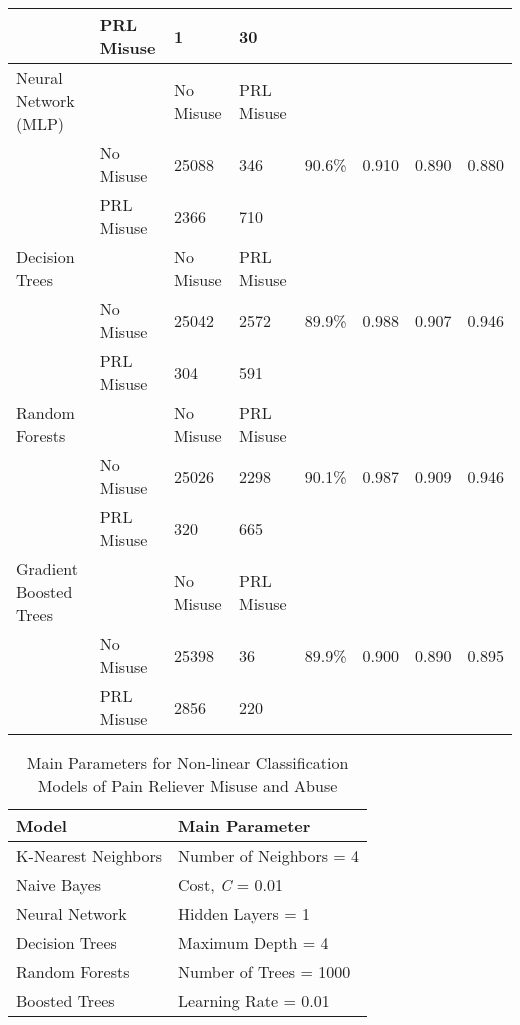 \documentclass[sigconf]{acmart}
\begin{document}
\begin{table*}[ht]
\begin{tabular}{llllllll}
     & PRL Misuse & 1 & 30 &  &  &  & \\
    \midrule
    Neural Network (MLP) & & No Misuse & PRL Misuse &  &  &  & \\
     & No Misuse & 25088 & 346 & 90.6\% & 0.910 & 0.890 & 0.880 \\
     & PRL Misuse & 2366 & 710 &  &  &  & \\
    \midrule
    Decision Trees & & No Misuse & PRL Misuse &  &  &  & \\
     & No Misuse & 25042 & 2572 & 89.9\% & 0.988 & 0.907 & 0.946 \\
     & PRL Misuse & 304 & 591 &  &  &  & \\
    \midrule
    Random Forests & & No Misuse & PRL Misuse &  &  &  & \\
     & No Misuse & 25026 & 2298 & 90.1\% & 0.987 & 0.909 & 0.946 \\
     & PRL Misuse & 320 & 665 &  &  &  & \\
    \midrule
    Gradient Boosted Trees & & No Misuse & PRL Misuse &  &  &  & \\
     & No Misuse & 25398 & 36 & 89.9\% & 0.900 & 0.890 & 0.895 \\
     & PRL Misuse & 2856 & 220 &  &  &  & \\
    \bottomrule
  \end{tabular}
\end{table*}


\begin{table}
  \caption{Main Parameters for Non-linear Classification Models of 
  Pain Reliever Misuse and Abuse}
  \label{tab:freq}
  \begin{tabular}{ll}
    \toprule
    Model & Main Parameter \\
    \midrule
    K-Nearest Neighbors & Number of Neighbors = 4 \\
    Naive Bayes & Cost, \textit{C} = 0.01 \\
    Neural Network & Hidden Layers = 1 \\
    Decision Trees & Maximum Depth = 4 \\ 
    Random Forests & Number of Trees = 1000 \\
    Boosted Trees & Learning Rate = 0.01 \\ 
    \bottomrule
  \end{tabular}
\end{table}
\end{document}
